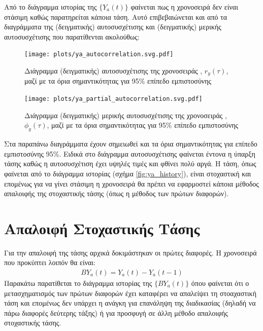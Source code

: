 Από το διάγραμμα ιστορίας της $\{Y_a(t)\}$ φαίνεται πως η χρονοσειρά δεν είναι στάσιμη καθώς παρατηρείται κάποια τάση. Αυτό επιβεβαιώνεται και από τα διαγράμματα της (δειγματικής) αυτοσυσχέτισης και (δειγματικής) μερικής αυτοσυσχέτισης που παρατίθενται ακολούθως:

\begin{figure}[H]
    \begin{center}
        \texttt{[image: plots/ya\_autocorrelation.svg.pdf]}
        \caption{Διάγραμμα (δειγματικής) αυτοσυσχέτισης της χρονοσειράς , $r_y(\tau)$, μαζί με τα όρια σημαντικότητας για 95\% επίπεδο εμπιστοσύνης}
        \label{fig:ya_autocorrelation}
    \end{center}
\end{figure}

\begin{figure}[H]
    \begin{center}
        \texttt{[image: plots/ya\_partial\_autocorrelation.svg.pdf]}
        \caption{Διάγραμμα (δειγματικής) μερικής αυτοσυσχέτισης της χρονοσειράς , $\phi_y(\tau)$, μαζί με τα όρια σημαντικότητας για 95\% επίπεδο εμπιστοσύνης}
        \label{fig:ya_partial_autocorrelation}
    \end{center}
\end{figure}

Στα παραπάνω διαγράμματα έχουν σημειωθεί και τα όρια σημαντικότητας για επίπεδο εμπιστοσύνης 95\%. Ειδικά στο διάγραμμα αυτοσυσχέτισης φαίνεται έντονα η ύπαρξη τάσης καθώς η αυτοσυσχέτιση έχει υψηλές τιμές και φθίνει πολύ αργά. Η τάση, όπως φαίνεται από το διάγραμμα ιστορίας (σχήμα \ref{fig:ya_history}), είναι στοχαστική και επομένως για να γίνει στάσιμη η χρονοσειρά θα πρέπει να εφαρμοστεί κάποια μέθοδος απαλοιφής της στοχαστικής τάσης (όπως η μέθοδος των πρώτων διαφορών).

\section{Απαλοιφή Στοχαστικής Τάσης}

Για την απαλοιφή της τάσης αρχικά δοκιμάστηκαν οι πρώτες διαφορές. Η χρονοσειρά που προκύπτει λοιπόν θα είναι:
\begin{align}
    BY_a(t) = Y_a(t) - Y_a(t-1)
\end{align}
Παρακάτω παρατίθεται το διάγραμμα ιστορίας της $\{BY_a(t)\}$ όπου φαίνεται ότι ο μετασχηματισμός των πρώτων διαφορών έχει καταφέρει να απαλείψει τη στοαχαστική τάση και επομένως δεν υπάρχει η ανάγκη για επανάληψη της διαδικασίας (δηλαδή να πάρω διαφορές δεύτερης τάξης) ή για προσφυγή σε άλλη μέθοδο απαλοιφής στοχαστικής τάσης.

